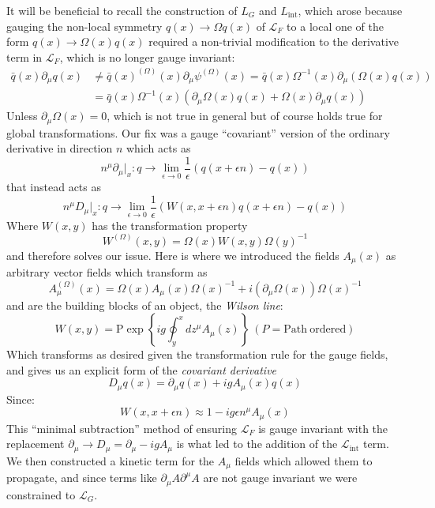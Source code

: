 \documentclass[11pt]{article}
\begin{document}
It will be beneficial to recall the construction of $L_G$ and $L_{\mathrm{int}}$, which arose because gauging the non-local symmetry $q(x)\to \Omega q(x)$ of $\mathcal L_F$ to a local one of the form $q(x)\to \Omega(x)q(x)$ required a non-trivial modification to the derivative term in $\mathcal L_F$, which is no longer gauge invariant: 
\begin{align*}\bar q(x)\partial_\mu q(x)&\neq \bar q(x)^{(\Omega)}(x)\partial_\mu\psi^{(\Omega)}(x)=\bar q(x)\Omega^{-1}(x)\partial_\mu\left(\Omega(x) q(x)\right)\\&=\bar q(x)\Omega^{-1}(x)(\partial_\mu\Omega(x)q(x)+\Omega(x)\partial_\mu q(x))\end{align*}
Unless $\partial_\mu\Omega(x)=0$, which is not true in general but of course holds true for global transformations. Our fix was a gauge ``covariant'' version of the ordinary derivative in direction $n$ which acts as 
\begin{equation}n^\mu\partial_\mu\vert_x:q\to \lim_{\epsilon\to0}\frac{1}{\epsilon}(q(x+\epsilon n)-q(x))\end{equation}
that instead acts as 
\begin{equation}n^\mu D_\mu\vert_x:q\to \lim_{\epsilon\to0}\frac{1}{\epsilon}(W(x,x+\epsilon n)q(x+\epsilon n)-q(x))\end{equation}
Where $W(x,y)$ has the transformation property
\begin{equation}W^{(\Omega)}(x,y)=\Omega(x)W(x,y)\Omega(y)^{-1}\end{equation}
and therefore solves our issue. Here is where we introduced the fields $A_\mu(x)$ as arbitrary vector fields which transform as
\begin{equation}A_\mu^{(\Omega)}(x)=\Omega(x)A_\mu(x)\Omega(x)^{-1}+i(\partial_\mu\Omega(x))\Omega(x)^{-1}\end{equation}
and are the building blocks of an object, the \textit{Wilson line}:
\begin{equation}\label{eq:wilson_line}W(x,y)=\mathrm{P}\exp\left\{ig\oint_y^x dz^\mu A_\mu(z)\right\}\ (P=\mathrm{Path\ ordered})\end{equation}
Which transforms as desired given the transformation rule for the gauge fields, and gives us an explicit form of the \textit{covariant derivative}
\begin{equation}D_\mu q(x)=\partial_\mu q(x)+igA_\mu(x) q(x)\end{equation}
Since:
\begin{equation}W(x,x+\epsilon n)\approx1-ig\epsilon n^\mu A_\mu(x)\end{equation}
This ``minimal subtraction'' method of ensuring $\mathcal L_F$ is gauge invariant with the replacement $\partial_\mu\to D_\mu=\partial_\mu-igA_\mu$ is what led to the addition of the $\mathcal L_{\mathrm{int}}$ term. We then constructed a kinetic term for the $A_\mu$ fields which allowed them to propagate, and since terms like $\partial_\mu A \partial^\mu A$ are not gauge invariant we were constrained to $\mathcal L_G$. 
\end{document}
